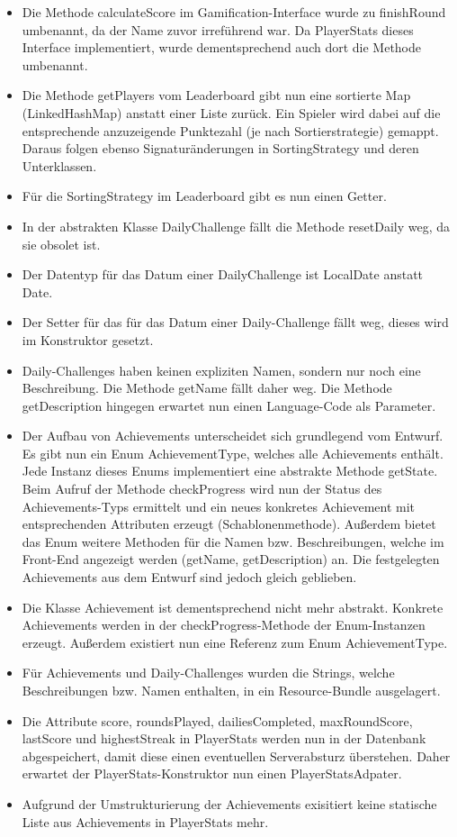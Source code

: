 \documentclass[a4paper]{scrreprt}
\begin{document}
\begin{itemize}
  \item Die Methode calculateScore im Gamification-Interface wurde zu finishRound umbenannt, da der Name zuvor irreführend war. Da PlayerStats dieses Interface implementiert, wurde dementsprechend auch dort die Methode umbenannt.
  \item Die Methode getPlayers vom Leaderboard gibt nun eine sortierte Map (LinkedHashMap) anstatt einer Liste zurück. Ein Spieler wird dabei auf die entsprechende anzuzeigende Punktezahl (je nach Sortierstrategie) gemappt. Daraus folgen ebenso Signaturänderungen in SortingStrategy und deren Unterklassen.
  \item Für die SortingStrategy im Leaderboard gibt es nun einen Getter.
  \item In der abstrakten Klasse DailyChallenge fällt die Methode resetDaily weg, da sie obsolet ist.
  \item Der Datentyp für das Datum einer DailyChallenge ist LocalDate anstatt Date.
  \item Der Setter für das für das Datum einer Daily-Challenge fällt weg, dieses wird im Konstruktor gesetzt.
  \item Daily-Challenges haben keinen expliziten Namen, sondern nur noch eine Beschreibung. Die Methode getName fällt daher weg. Die Methode getDescription hingegen erwartet nun einen Language-Code als Parameter.
  \item Der Aufbau von Achievements unterscheidet sich grundlegend vom Entwurf. Es gibt nun ein Enum AchievementType, welches alle Achievements
    enthält. Jede Instanz dieses Enums implementiert eine abstrakte Methode getState. Beim Aufruf der Methode checkProgress
    wird nun der Status des Achievements-Typs ermittelt und ein neues konkretes Achievement mit entsprechenden Attributen
    erzeugt (Schablonenmethode). Außerdem bietet das Enum weitere Methoden für die Namen bzw. Beschreibungen, welche im Front-End
    angezeigt werden (getName, getDescription) an. Die festgelegten Achievements aus dem Entwurf sind jedoch gleich geblieben.
  \item Die Klasse Achievement ist dementsprechend nicht mehr abstrakt. Konkrete Achievements werden in der checkProgress-Methode
    der Enum-Instanzen erzeugt. Außerdem existiert nun eine Referenz zum Enum AchievementType.
  \item Für Achievements und Daily-Challenges wurden die Strings, welche Beschreibungen bzw. Namen enthalten, in ein Resource-Bundle ausgelagert.
  \item Die Attribute score, roundsPlayed, dailiesCompleted, maxRoundScore, lastScore und highestStreak in PlayerStats werden nun in der Datenbank abgespeichert, damit diese
    einen eventuellen Serverabsturz überstehen. Daher erwartet der PlayerStats-Konstruktor nun einen PlayerStatsAdpater.
  \item Aufgrund der Umstrukturierung der Achievements exisitiert keine statische Liste aus Achievements in PlayerStats mehr.
\end{itemize}
\end{document}
